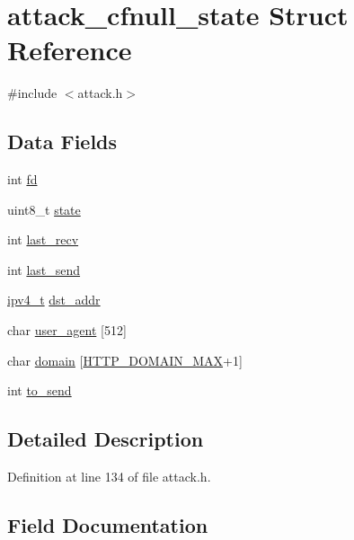 \hypertarget{structattack__cfnull__state}{}\section{attack\+\_\+cfnull\+\_\+state Struct Reference}
\label{structattack__cfnull__state}


{\ttfamily \#include $<$attack.\+h$>$}

\subsection*{Data Fields}
\begin{DoxyCompactItemize}
\item 
int \hyperlink{structattack__cfnull__state_a6f8059414f0228f0256115e024eeed4b}{fd}
\item 
uint8\+\_\+t \hyperlink{structattack__cfnull__state_a0b57aa10271a66f3dc936bba1d2f3830}{state}
\item 
int \hyperlink{structattack__cfnull__state_ad127e56d0e8e42d9e183c7779015c25a}{last\+\_\+recv}
\item 
int \hyperlink{structattack__cfnull__state_a04740a05fb3dde2a4f4fc74ebd900715}{last\+\_\+send}
\item 
\hyperlink{loader_2src_2headers_2includes_8h_aaadf2e480fd246ff9e932039b223baed}{ipv4\+\_\+t} \hyperlink{structattack__cfnull__state_a2d22095a6311539df835109315b37ffe}{dst\+\_\+addr}
\item 
char \hyperlink{structattack__cfnull__state_ad822f3afc6ca96d5e6968831ba0c9d25}{user\+\_\+agent} \mbox{[}512\mbox{]}
\item 
char \hyperlink{structattack__cfnull__state_a68d155fe5b39db18852b16d2fdaf1edc}{domain} \mbox{[}\hyperlink{attack_8h_af13bc0acf7afcddfcc5098dbe5c343aa}{H\+T\+T\+P\+\_\+\+D\+O\+M\+A\+I\+N\+\_\+\+M\+AX}+1\mbox{]}
\item 
int \hyperlink{structattack__cfnull__state_a17ed86462464729ba8f66f8488aaf329}{to\+\_\+send}
\end{DoxyCompactItemize}


\subsection{Detailed Description}


Definition at line 134 of file attack.\+h.



\subsection{Field Documentation}
